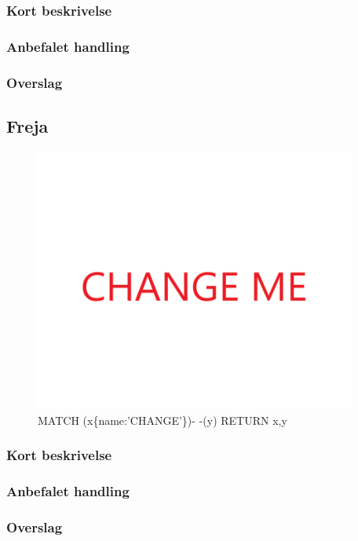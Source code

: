 \documentclass{article}
\begin{document}
\subsubsection{Kort beskrivelse}
\subsubsection{Anbefalet handling}
\subsubsection{Overslag}
\subsection{Freja}
\begin{figure}[h]
\includegraphics[width=300pt]{CHANGE.PNG}
\caption{MATCH (x\{name:'CHANGE'\})- -(y) RETURN x,y}
\end{figure}
\subsubsection{Kort beskrivelse}
\subsubsection{Anbefalet handling}
\subsubsection{Overslag}
\end{document}
